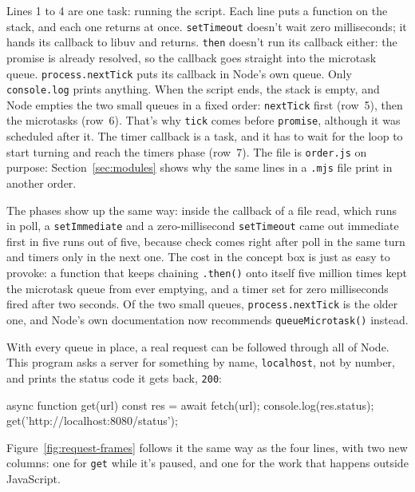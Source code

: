 Lines 1 to 4 are one task: running the script. Each line puts a function on the
stack, and each one returns at once. \texttt{setTimeout} doesn't wait zero
milliseconds; it hands its callback to libuv and returns. \texttt{then} doesn't
run its callback either: the promise is already resolved, so the callback goes
straight into the microtask queue. \texttt{process.nextTick} puts its callback
in Node's own queue. Only \texttt{console.log} prints anything. When the script
ends, the stack is empty, and Node empties the two small queues in a fixed
order: \texttt{nextTick} first (row~5), then the microtasks (row~6). That's why
\texttt{tick} comes before \texttt{promise}, although it was scheduled after
it. The timer callback is a task, and it has to wait for the loop to start
turning and reach the timers phase (row~7). The file is \texttt{order.js} on
purpose: Section~\ref{sec:modules} shows why the same lines in a \texttt{.mjs}
file print in another order.

The phases show up the same way: inside the callback of a file read, which runs
in poll, a \texttt{setImmediate} and a zero-millisecond \texttt{setTimeout} came
out immediate first in five runs out of five, because check comes right after
poll in the same turn and timers only in the next one. The cost in the concept
box is just as easy to provoke: a function that keeps chaining
\texttt{.then()} onto itself five million times kept the microtask queue from
ever emptying, and a timer set for zero milliseconds fired after two seconds.
Of the two small queues, \texttt{process.nextTick} is the older one, and Node's
own documentation now recommends \texttt{queueMicrotask()} instead.

With every queue in place, a real request can be followed through all of Node.
This program asks a server for something by name, \texttt{localhost}, not by
number, and prints the status code it gets back, \texttt{200}:

\begin{code}
async function get(url) {
  const res = await fetch(url);
  console.log(res.status);
}
get('http://localhost:8080/status');
\end{code}

Figure~\ref{fig:request-frames} follows it the same way as the four lines, with
two new columns: one for \texttt{get} while it's paused, and one for the work
that happens outside JavaScript.

